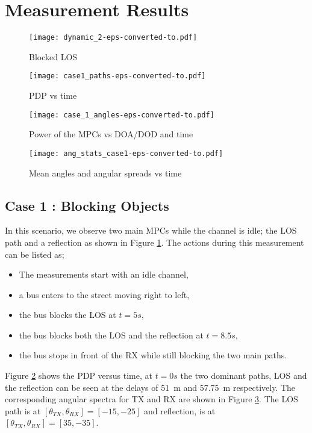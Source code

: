 \documentclass[conference]{IEEEtran}
\begin{document}
\section{Measurement Results} \label{sec_result}


\begin{figure}[tbp]
        \centering\texttt{[image: dynamic\_2-eps-converted-to.pdf]}\caption{Blocked LOS}\label{fig:dynamic_1}
\end{figure}

\begin{figure}[tbp]
        \centering\texttt{[image: case1\_paths-eps-converted-to.pdf]}\caption{PDP vs time}\label{fig:paths_1}
\end{figure}

\begin{figure}[tbp]
        \centering\texttt{[image: case\_1\_angles-eps-converted-to.pdf]}\caption{Power of the MPCs vs DOA/DOD and time}\label{fig:angles_1}
\end{figure}

\begin{figure}[tbp]
        \centering\texttt{[image: ang\_stats\_case1-eps-converted-to.pdf]}\caption{Mean angles and angular spreads vs time}\label{fig:angstats}
\end{figure}

\subsection{Case 1 : Blocking Objects}

In this scenario, we observe two main MPCs while the channel is idle; the LOS path and a reflection as shown in Figure \ref{fig:dynamic_1}. The actions during this measurement can be listed as;
\begin{itemize}
  \item The measurements start with an idle channel,
  \item a bus enters to the street moving right to left,
  \item the bus blocks the LOS at $t=5s$,
  \item the bus blocks both the LOS and the reflection at $t=8.5s$,
  \item the bus stops in front of the RX while still blocking the two main paths.
\end{itemize}

Figure \ref{fig:paths_1} shows the PDP versus time, at $t=0s$ the two dominant paths, LOS and the reflection can be seen at the delays of \SI{51}{m} and \SI{57.75}{m} respectively. The corresponding angular spectra for TX and RX are shown in Figure \ref{fig:angles_1}. The LOS path is at $[\theta_{TX},\theta_{RX}]=[-15,-25]$  and reflection, is at $[\theta_{TX},\theta_{RX}]=[35,-35]$. 
\end{document}
